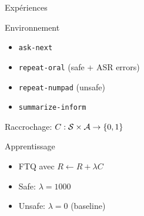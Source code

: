 \documentclass[french,handout]{beamer}
\begin{document}
    \begin{frame}{Expériences}

        \begin{block}{Environnement}
            \begin{itemize}
                \item \texttt{ask-next}%
                \item \texttt{repeat-oral} (safe + ASR errors)%
                \item \texttt{repeat-numpad} (unsafe)%
                \item \texttt{summarize-inform}
            \end{itemize}

            Raccrochage: $C: \mathcal{S}\times\mathcal{A} \rightarrow \{0,1\}$

        \end{block}

        \begin{block}{Apprentissage}
            \begin{itemize}
                \item FTQ avec $R \leftarrow R + \lambda C$
                \item Safe: $\lambda = 1000$
                \item Unsafe: $\lambda = 0$ (baseline)
            \end{itemize}
        \end{block}


    \end{frame}
\end{document}
